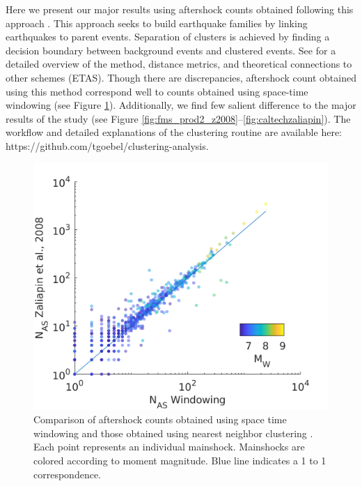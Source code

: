 \documentclass[draft]{agujournal}
\begin{document}
Here we present our major results using aftershock counts obtained following this approach \citet{Zaliapin2008}. This approach seeks to build earthquake families by linking earthquakes to parent events. Separation of clusters is achieved by finding a decision boundary between background events and clustered events. See \citet{Zaliapin2008} for a detailed overview of the method, distance metrics, and theoretical connections to other schemes (ETAS). Though there are discrepancies, aftershock count obtained using this method correspond well to counts obtained using space-time windowing (see Figure \ref{fig:method_val}). Additionally, we find few salient difference to the major results of the study (see Figure \ref{fig:fms_prod2_z2008}--\ref{fig:caltechzaliapin}).
The workflow and detailed explanations of the clustering routine are available here: https://github.com/tgoebel/clustering-analysis.


\newpage
\begin{figure}[H]
\centering
\includegraphics{figures/method_validation.png} 
\caption{Comparison of aftershock counts obtained using space time windowing and those obtained using nearest neighbor clustering \citep[following][]{Zaliapin2008}. Each point represents an individual mainshock. Mainshocks are colored according to moment magnitude. Blue line indicates a 1 to 1 correspondence.}
\label{fig:method_val}
\end{figure}
\end{document}
